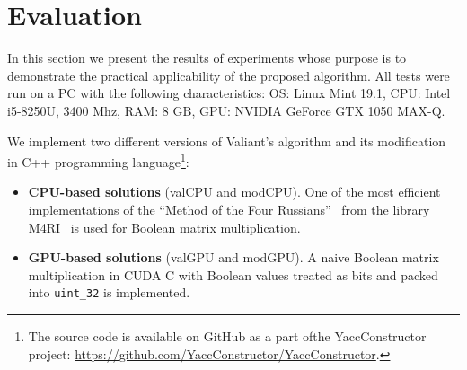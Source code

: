 \section{Evaluation}

In this section we present the results of experiments whose purpose is to demonstrate the practical applicability of the proposed algorithm. All tests were run on a PC with the following characteristics: OS: Linux Mint 19.1, CPU: Intel i5-8250U, 3400 Mhz, RAM: 8 GB, GPU: NVIDIA GeForce GTX 1050 MAX-Q.

We implement two different versions of Valiant's algorithm and its modification in C++ programming language\footnote{The source code is available on GitHub as a part ofthe YaccConstructor project: \url{https://github.com/YaccConstructor/YaccConstructor}.}:

\begin{itemize}
    \item \textbf{CPU-based solutions} (\textsf{valCPU} and \textsf{modCPU}).
    One of the most efficient implementations of the “Method of the Four Russians”~\cite{arlazarov1970economical} from the library M4RI~\cite{Albrecht_2010} is used for Boolean matrix multiplication. 
    \item \textbf{GPU-based solutions} (\textsf{valGPU} and \textsf{modGPU}).
    A naive Boolean matrix multiplication in CUDA C with Boolean values treated as bits and packed into \texttt{uint\_32} is implemented.
\end{itemize}


